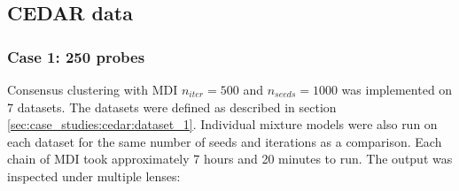 \documentclass[12pt]{article} %
\begin{document}

	\subsection{CEDAR data} \label{sec:results:cedar}
	\subsubsection{Case 1: 250 probes} \label{sec:results:cedar:dataset_1}
	Consensus clustering with MDI $n_{iter}=500$ and $n_{seeds}=1000$ was implemented on 7 datasets. The datasets were defined as described in section \ref{sec:case_studies:cedar:dataset_1}. Individual mixture models were also run on each dataset for the same number of seeds and iterations as a comparison. Each chain of MDI took approximately 7 hours and 20 minutes to run. The output was inspected under multiple lenses: 
	
\end{document}
